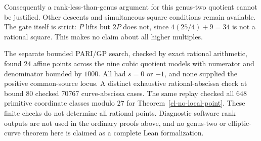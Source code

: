 Consequently a rank-less-than-genus argument for this genus-two
quotient cannot be justified. Other descents and simultaneous
square conditions remain available. The gate itself is strict:
\(P\) lifts but \(2P\) does not, since \(4(25/4)+9=34\) is
not a rational square. This makes no claim about all higher multiples.

The separate bounded PARI/GP search, checked by exact rational
arithmetic, found \(24\) affine points across the nine cubic
quotient models with numerator and denominator bounded by \(1000\).
All had \(s=0\) or \(-1\), and none supplied the positive
common-source locus. A distinct exhaustive rational-abscissa check
at bound \(80\) checked \(70767\) curve-abscissa cases.
The same replay checked all \(648\) primitive coordinate classes
modulo \(27\) for Theorem~\ref{cl-no-local-point}.
These finite checks do not determine all rational points.
Diagnostic software rank outputs are not used in the ordinary
proofs above, and no genus-two or elliptic-curve theorem here is
claimed as a complete Lean formalization.
